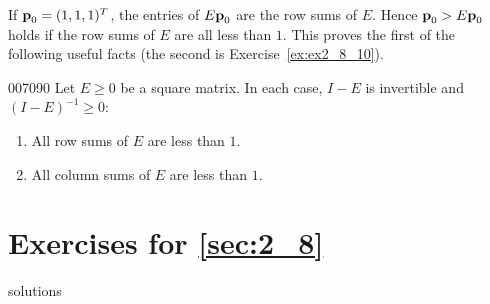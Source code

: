 If $\textbf{p}_{0} = (1, 1, 1)^{T}$, the entries of $E\textbf{p}_{0}$ are the row sums of $E$. Hence $\textbf{p}_{0} > E\textbf{p}_{0}$ holds if the row sums of $E$ are all less than $1$. This proves the first of the following useful facts (the second is Exercise~\ref{ex:ex2_8_10}).

\begin{corollary}{}{007090}
Let $E \geq 0$ be a square matrix. In each case, $I - E$ is invertible and $(I - E)^{-1} \geq 0$:

\begin{enumerate}
\item All row sums of $E$ are less than $1$.

\item All column sums of $E$ are less than $1$.

\end{enumerate}
\end{corollary}

\vspace*{-2em}
\section*{Exercises for \ref{sec:2_8}}

\begin{Filesave}{solutions}
\end{Filesave}

